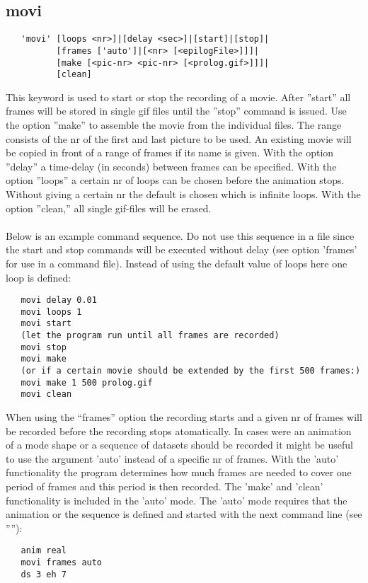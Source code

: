 \documentclass{article}
\begin{document}
\subsection{\label{movi}movi}
\begin{verbatim}
   'movi' [loops <nr>]|[delay <sec>]|[start]|[stop]|
          [frames ['auto']|[<nr> [<epilogFile>]]]|
          [make [<pic-nr> <pic-nr> [<prolog.gif>]]]|
          [clean]
\end{verbatim}
This keyword is used to start or stop the recording of a movie. After ''start'' all frames will be stored in single gif files until the ''stop'' command is issued. Use the option ''make'' to assemble the movie from the individual files. The range consists of the nr of the first and last picture to be used. An existing movie will be copied in front of a range of frames if its name is given. With the option ''delay'' a time-delay (in seconds) between frames can be specified. With the option ''loops'' a certain nr of loops can be chosen before the animation stops. Without giving a certain nr the default is chosen which is infinite loops. With the option ''clean,'' all single gif-files will be erased.\\\\Below is an example command sequence. Do not use this sequence in a file since the start and stop commands will be executed without delay (see option 'frames' for use in a command file). Instead of using the default value of loops here one loop is defined:
\begin{verbatim}
   movi delay 0.01
   movi loops 1
   movi start
   (let the program run until all frames are recorded)
   movi stop
   movi make
   (or if a certain movie should be extended by the first 500 frames:)
   movi make 1 500 prolog.gif
   movi clean 
\end{verbatim}
When using the ``frames'' option the recording starts and a given nr of frames will be recorded before the recording stops atomatically. In cases were an animation of a mode shape or a sequence of datasets should be recorded it might be useful to use the argument 'auto' instead of a specific nr of frames. With the 'auto' functionality the program determines how much frames are needed to cover one period of frames and this period is then recorded. The 'make' and 'clean' functionality is included in the 'auto' mode. The 'auto' mode requires that the animation or the sequence is defined and started with the next command line (see ''''):
\begin{verbatim}
   anim real
   movi frames auto
   ds 3 eh 7
\end{verbatim}
\end{document}

